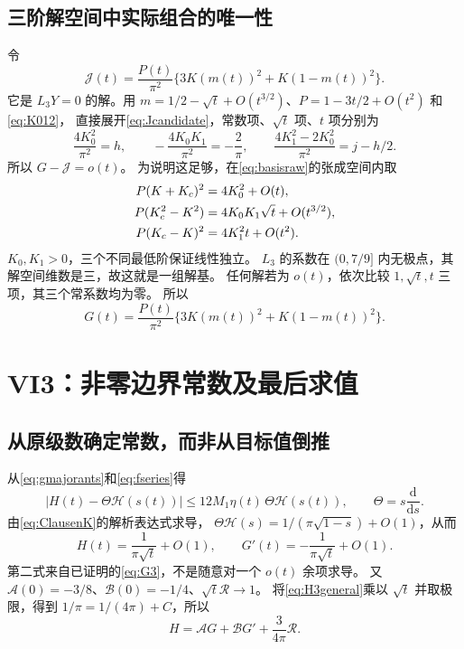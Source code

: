 \documentclass[11pt,a4paper]{article}
\numberwithin{equation}{section}
\theoremstyle{remark}\newtheorem{remark}[theorem]{说明}
\newcommand{\dd}{\mathrm d}
\newcommand{\HH}{\mathscr H}
\newcommand{\RR}{\mathcal R}
\newcommand{\Afun}{\mathcal A}
\newcommand{\BB}{\mathcal B}
\begin{document}
\subsection{三阶解空间中实际组合的唯一性}
令
\begin{equation}\label{eq:Jcandidate}
 \mathcal J(t)=\frac{P(t)}{\pi^2}\{3K(m(t))^2+K(1-m(t))^2\}.
\end{equation}
它是 $L_3Y=0$ 的解。用
$m=1/2-\sqrt t+O(t^{3/2})$、$P=1-3t/2+O(t^2)$ 和\eqref{eq:K012}，
直接展开\eqref{eq:Jcandidate}，常数项、$\sqrt t$ 项、$t$ 项分别为
\[
 \frac{4K_0^2}{\pi^2}=h,\qquad
 -\frac{4K_0K_1}{\pi^2}=-\frac2\pi,\qquad
 \frac{4K_1^2-2K_0^2}{\pi^2}=j-h/2.
\]
所以 $G-\mathcal J=o(t)$。
为说明这足够，在\eqref{eq:basisraw}的张成空间内取
\begin{align}
 P(K+K_c)^2&=4K_0^2+O(t),\notag\\
 P(K_c^2-K^2)&=4K_0K_1\sqrt t+O(t^{3/2}),\label{eq:adaptedbasis}\\
 P(K_c-K)^2&=4K_1^2t+O(t^2).\notag
\end{align}
$K_0,K_1>0$，三个不同最低阶保证线性独立。
$L_3$ 的系数在 $(0,7/9]$ 内无极点，其解空间维数是三，故这就是一组解基。
任何解若为 $o(t)$，依次比较 $1,\sqrt t,t$ 三项，其三个常系数均为零。
所以
\begin{equation}\label{eq:G3}
 \boxed{G(t)=\frac{P(t)}{\pi^2}\{3K(m(t))^2+K(1-m(t))^2\}.}
\end{equation}

\section{VI3：非零边界常数及最后求值}
\subsection{从原级数确定常数，而非从目标值倒推}
从\eqref{eq:gmajorants}和\eqref{eq:fseries}得
\[
 |H(t)-\Theta\HH(s(t))|\le12M_1\eta(t)\,\Theta\HH(s(t)),\qquad
 \Theta=s\frac{\dd}{\dd s}.
\]
由\eqref{eq:ClausenK}的解析表达式求导，
$\Theta\HH(s)=1/(\pi\sqrt{1-s})+O(1)$，从而
\[
 H(t)=\frac1{\pi\sqrt t}+O(1),\qquad
 G'(t)=-\frac1{\pi\sqrt t}+O(1).
\]
第二式来自已证明的\eqref{eq:G3}，不是随意对一个 $o(t)$ 余项求导。
又 $\Afun(0)=-3/8$、$\BB(0)=-1/4$、$\sqrt t\RR\to1$。
将\eqref{eq:H3general}乘以 $\sqrt t$ 并取极限，得到
$1/\pi=1/(4\pi)+C$，所以
\begin{equation}\label{eq:H3}
 \boxed{H=\Afun G+\BB G'+\frac3{4\pi}\RR.}
\end{equation}
\end{document}
